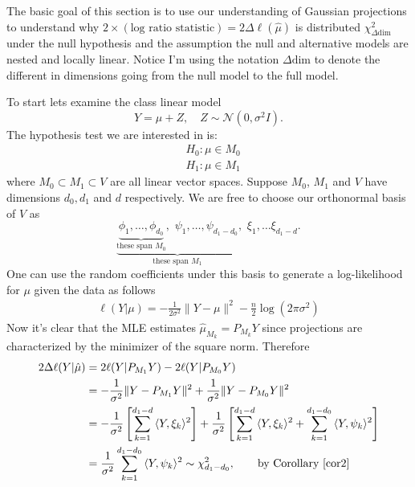 \documentclass[11pt]{report}
\begin{document}
The basic goal of this section is to use our understanding of Gaussian projections to understand why $2\times(\text{log ratio statistic})= 2\Delta \ell(\hat \mu)$ is distributed $\chi^2_{\Delta \text{dim}}$ under the null hypothesis and the assumption the null and alternative models are nested and locally linear. Notice I'm using the notation $\Delta \text{dim}$ to denote the different in dimensions going from the null model to the full model.

To start lets examine the class linear model
\[Y = \mu + Z,\quad Z\sim\mathcal N(0,\sigma^2I). \]
The hypothesis test we are interested in is:
\begin{align*}
&H_0: \mu\in M_0\\
&H_1: \mu \in M_1
\end{align*}
where $M_0\subset M_1 \subset V$ are all linear vector spaces. Suppose $M_0$, $M_1$ and $V$ have dimensions $d_0, d_1$ and $d$ respectively. We are free to choose our orthonormal basis of $V$ as 
\[\underbrace{\underbrace{\phi_1,\ldots, \phi_{d_0}}_{\text{these span $M_0$}},\,\, \psi_{1},\ldots, \psi_{d_1 - d_0}}_{\text{these span $M_1$}},\,\, \xi_1,\ldots \xi_{d_1 - d}.\]
One can use the random coefficients under this basis to generate a log-likelihood for $\mu$ given the data as follows 
\begin{align*}
\ell(Y|\mu) =-\frac{1}{2\sigma^2} \|Y - \mu \|^2 - \frac{n}{2}\log(2\pi\sigma^{2})
\end{align*}
Now it's clear that the MLE estimates $\hat\mu_{M_k}=P_{M_k}Y$ since projections are characterized by the minimizer of the square norm. Therefore
\begin{align*}
2\Delta \ell(Y|\hat\mu) &= 2\ell(Y|P_{M_1}Y) - 2\ell(Y|P_{M_0}Y) \\
 &= -\frac{1}{\sigma^2} \|Y - P_{M_1}Y \|^2 + \frac{1}{\sigma^2} \|Y - P_{M_0}Y \|^2 \\
 &= -\frac{1}{\sigma^2} \left[\sum_{k=1}^{d_1-d}{\langle Y,\xi_k \rangle^2}\right] + \frac{1}{\sigma^2}  \left[ \sum_{k=1}^{d_1-d}{\langle Y,\xi_k \rangle^2}+  \sum_{k=1}^{d_1-d_0}{\langle Y,\psi_k \rangle^2}\right] \\
 &= \frac{1}{\sigma^2}  \sum_{k=1}^{d_1-d_0}{\langle Y,\psi_k \rangle^2} \sim \chi^2_{d_1 - d_0}, \qquad \text{by Corollary \ref{cor2}}
\end{align*}
\end{document}

